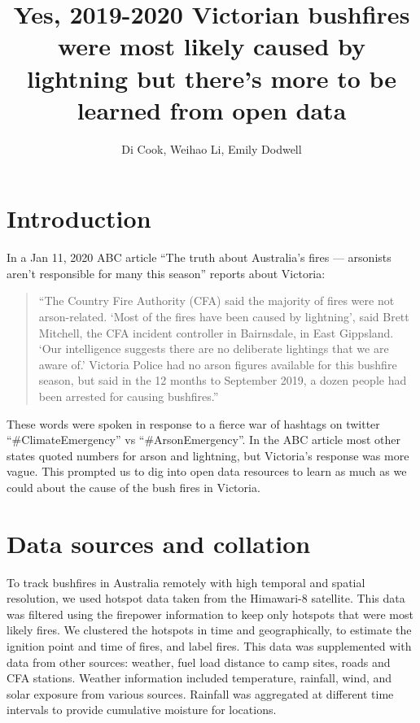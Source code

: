 \documentclass[
  11pt,
  a4paper,
]{article}
\title{Yes, 2019-2020 Victorian bushfires were most likely caused by lightning but there's more to be learned from open data}
\author{Di Cook, Weihao Li, Emily Dodwell}
\date{}
\begin{document}
\maketitle

\hypertarget{intro}{%
\section{Introduction}\label{intro}}

In a Jan 11, 2020 ABC article ``The truth about Australia's fires --- arsonists aren't responsible for many this season'' reports about Victoria:

\begin{quote}
``The Country Fire Authority (CFA) said the majority of fires were not arson-related. `Most of the fires have been caused by lightning', said Brett Mitchell, the CFA incident controller in Bairnsdale, in East Gippsland. `Our intelligence suggests there are no deliberate lightings that we are aware of.' Victoria Police had no arson figures available for this bushfire season, but said in the 12 months to September 2019, a dozen people had been arrested for causing bushfires.''
\end{quote}

These words were spoken in response to a fierce war of hashtags on twitter ``\#ClimateEmergency'' vs ``\#ArsonEmergency''. In the ABC article most other states quoted numbers for arson and lightning, but Victoria's response was more vague. This prompted us to dig into open data resources to learn as much as we could about the cause of the bush fires in Victoria.

\hypertarget{data}{%
\section{Data sources and collation}\label{data}}

To track bushfires in Australia remotely with high temporal and spatial resolution, we used hotspot data taken from the Himawari-8 satellite. This data was filtered using the firepower information to keep only hotspots that were most likely fires. We clustered the hotspots in time and geographically, to estimate the ignition point and time of fires, and label fires. This data was supplemented with data from other sources: weather, fuel load distance to camp sites, roads and CFA stations. Weather information included temperature, rainfall, wind, and solar exposure from various sources. Rainfall was aggregated at different time intervals to provide cumulative moisture for locations.
\end{document}
